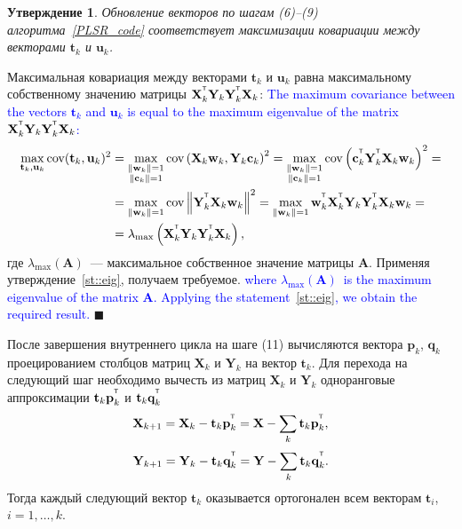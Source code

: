 \documentclass[12pt,twoside]{article}
\newtheorem{statement}{Утверждение}
\newcommand{\bw}{\mathbf{w}}
\newcommand{\bY}{\mathbf{Y}}
\newcommand{\bX}{\mathbf{X}}
\newcommand{\bu}{\mathbf{u}}
\newcommand{\bt}{\mathbf{t}}
\newcommand{\bp}{\mathbf{p}}
\newcommand{\bq}{\mathbf{q}}
\newcommand{\bc}{\mathbf{c}}
\newcommand{\T}{^{\text{\tiny\sffamily\upshape\mdseries T}}}
\begin{document}
\begin{statement}
Обновление векторов по шагам (6)--(9) алгоритма~\ref{PLSR_code} соответствует максимизации ковариации между векторами $\bt_k$ и $\bu_k$.
\end{statement}
Максимальная ковариация между векторами $\bt_k$ и $\bu_k$ равна максимальному собственному значению матрицы $\bX_k^{\T} \bY_k \bY_k^{\T} \bX_k$:
\textcolor{blue}{
The maximum covariance between the vectors $\bt_k$ and $\bu_k$ is equal to the maximum eigenvalue of the matrix $\bX_k^{\T} \bY_k \bY_k^{\T} \bX_k$:}
\begin{align*}
\max_{\bt_k, \bu_k}  \text{cov} (\bt_k, \bu_k)^2 &= \max_{\substack{\|\bw_k\|=1 \\ \|\bc_k\| = 1}} \text{cov} \left( \bX_k \bw_k, \bY_k \bc_k \right)^2 = \max_{\substack{\|\bw_k\|=1 \\ \|\bc_k\| = 1}} \text{cov} \left(\bc_k^{\T}  \bY_k^{\T} \bX_k \bw_k \right)^2 = \\
&= \max_{\|\bw_k\| = 1} \text{cov} \left\|\bY_k^{\T} \bX_k \bw_k \right\|^2 = \max_{\|\bw_k\| = 1} \bw_k^{\T} \bX_k^{\T} \bY_k \bY_k^{\T} \bX_k \bw_k = \\
& = \lambda_{\max} \left( \bX_k^{\T} \bY_k \bY_k^{\T} \bX_k \right),
\end{align*}
где $ \lambda_{\max} (\mathbf{A})$~--- максимальное собственное значение матрицы $\mathbf{A}$.
Применяя утверждение~\ref{st::eig}, получаем требуемое.
\textcolor{blue}{
where $ \lambda_{\max} (\mathbf{A})$~is the maximum eigenvalue of the matrix $\mathbf{A}$.
Applying the statement~\ref{st::eig}, we obtain the required result.}
$\blacksquare$

После завершения внутреннего цикла на шаге (11) вычисляются вектора $\bp_k$, $\bq_k$ проецированием столбцов матриц $\bX_k$ и $\bY_k$ на вектор $\bt_k$. Для перехода на следующий шаг необходимо вычесть из матриц $\bX_k$ и $\bY_k$ одноранговые аппроксимации $\bt_k \bp_k^{\T}$ и $\bt_k \bq_k^{\T}$
\begin{equation*}
    \bX_{k + 1} = \bX_{k} - \bt_k \bp_k^{\T} = \bX - \sum_k \bt_k \bp_k^{\T},
\end{equation*}
\begin{equation*}
    \bY_{k + 1} = \bY_{k} - \bt_k \bq_k^{\T} = \bY - \sum_k \bt_k \bq_k^{\T}.
\end{equation*}
Тогда каждый следующий вектор $\bt_k$ оказывается ортогонален всем векторам $\bt_i$, $i=1, \dots, k$.
\end{document}
